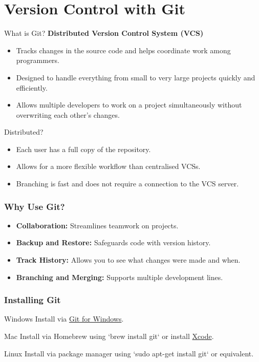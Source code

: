 \section{Version Control with Git}
\begin{frame}
	\begin{block}{What is Git?}
		\textbf{Distributed Version Control System (VCS)} 
		\begin{itemize}
			\item Tracks changes in the source code and helps coordinate work among programmers.
			\item Designed to handle everything from small to very large projects quickly and efficiently. 
			\item Allows multiple developers to work on a project simultaneously without overwriting each other's changes. 
		\end{itemize}
	\end{block}
	
	\begin{block}{Distributed?}
		\justifying
		\begin{itemize}
			\item Each user has a full copy of the repository.
			\item Allows for a more flexible workflow than centralised VCSs.
			\item Branching is fast and does not require a connection to the VCS server.
		\end{itemize}
	\end{block}
	
\end{frame}


\begin{frame}
	\frametitle{Why Use Git?}
	\begin{itemize}
		\item \textbf{Collaboration:} Streamlines teamwork on projects.
		\item \textbf{Backup and Restore:} Safeguards code with version history.
		\item \textbf{Track History:} Allows you to see what changes were made and when.
		\item \textbf{Branching and Merging:} Supports multiple development lines.
	\end{itemize}
\end{frame}

\begin{frame}
	\frametitle{Installing Git}
	\begin{block}{Windows}
		Install via \href{https://git-scm.com/download/win}{Git for Windows}.
	\end{block}
	\begin{block}{Mac}
		Install via Homebrew using `brew install git` or install \href{https://developer.apple.com/xcode/}{Xcode}.
	\end{block}
	\begin{block}{Linux}
		Install via package manager using `sudo apt-get install git` or equivalent.
	\end{block}
\end{frame}

